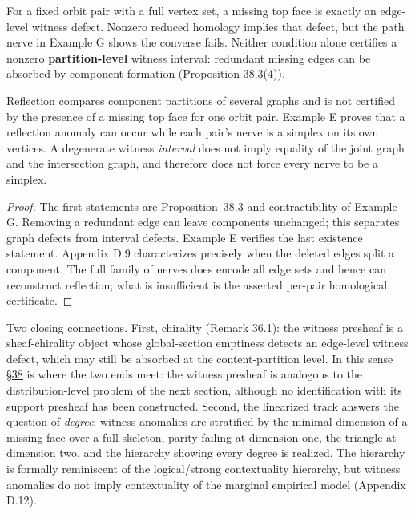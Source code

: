 \begin{thmplain}

For a fixed orbit pair with a full vertex set, a missing top face is exactly an edge-level witness defect. Nonzero reduced homology implies that defect, but the path nerve in Example G shows the converse fails. Neither condition alone certifies a nonzero \textbf{partition-level} witness interval: redundant missing edges can be absorbed by component formation (Proposition 38.3(4)).

Reflection compares component partitions of several graphs and is not certified by the presence of a missing top face for one orbit pair. Example E proves that a reflection anomaly can occur while each pair's nerve is a simplex on its own vertices. A degenerate witness \emph{interval} does not imply equality of the joint graph and the intersection graph, and therefore does not force every nerve to be a simplex.
\end{thmplain}

\begin{proof}

The first statements are \hyperlink{stmt:38.3}{Proposition~38.3} and contractibility of Example G. Removing a redundant edge can leave components unchanged; this separates graph defects from interval defects. Example E verifies the last existence statement. Appendix D.9 characterizes precisely when the deleted edges split a component. The full family of nerves does encode all edge sets and hence can reconstruct reflection; what is insufficient is the asserted per-pair homological certificate.
\end{proof}

Two closing connections. First, chirality (Remark 36.1): the witness presheaf is a sheaf-chirality object whose global-section emptiness detects an edge-level witness defect, which may still be absorbed at the content-partition level. In this sense \hyperlink{sec:38}{§38} is where the two ends meet: the witness presheaf is analogous to the distribution-level problem of the next section, although no identification with its support presheaf has been constructed. Second, the linearized track answers the question of \emph{degree}: witness anomalies are stratified by the minimal dimension of a missing face over a full skeleton, parity failing at dimension one, the triangle at dimension two, and the hierarchy showing every degree is realized. The hierarchy is formally reminiscent of the logical/strong contextuality hierarchy, but witness anomalies do not imply contextuality of the marginal empirical model (Appendix D.12).

